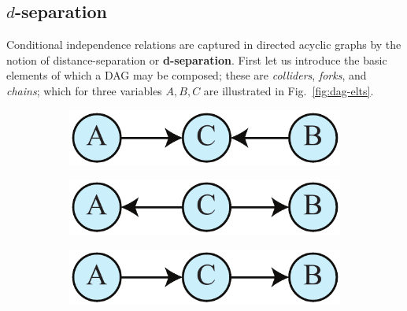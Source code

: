 \documentclass[letterpaper,onecolumn,nofootinbib]{revtex4}
\begin{document}
\begin{appendix}
\section{$d$-separation}
\label{app:dsep}

Conditional independence relations are captured in directed acyclic graphs by the notion of distance-separation or \textbf{d-separation}. First let us introduce the basic elements of which a DAG may be composed; these are \emph{colliders}, \emph{forks}, and \emph{chains}; which for three variables $A,B,C$ are illustrated in Fig.~\ref{fig:dag-elts}.
\newline
\begin{figure}[h]
	\begin{subfigure}[b]{0.18\textwidth}
                	\centering
                \includegraphics[width=\textwidth]{a-ind-b}
                	\label{fig:dag-collider}
        \end{subfigure}
	\hspace{5em}
        \begin{subfigure}[b]{0.18\textwidth}
                	\centering
                \includegraphics[width=\textwidth]{markovchain3}
                	\label{fig:dag-fork}
        \end{subfigure}
	\hspace{5em}
        \begin{subfigure}[b]{0.18\textwidth}
                	\centering
                	\includegraphics[width=\textwidth]{markovchain1}
		

\end{subfigure}
\end{figure}
\end{appendix}
\end{document}
